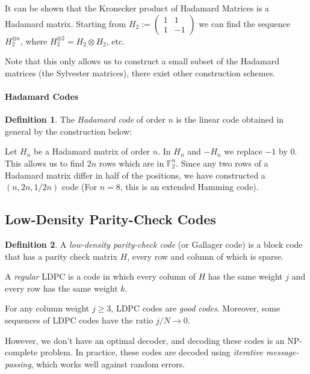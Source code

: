 \documentclass[11pt,a4paper]{article}
\theoremstyle{definition}
\newtheorem{definition}{Definition}[section]
\theoremstyle{plain}
\theoremstyle{remark}
\begin{document}
It can be shown that the Kronecker product of Hadamard Matrices is a Hadamard matrix. 
Starting from $H_2 := \begin{pmatrix}
    1 & 1 \\
    1 & -1 
\end{pmatrix}$ we can find the sequence $H_2^{\otimes n}$, where $H_2^{\otimes 2} = H_2 \otimes H_2$, etc. 

Note that this only allows us to construct a small subset of the Hadamard matrices (the Sylvester matrices), there exist other construction schemes.

\paragraph{Hadamard Codes} 
\begin{definition}
    The \emph{Hadamard code} of order $n$ is the linear code obtained in general by the construction below:
    
    Let $H_n$ be a Hadamard matrix of order $n$. In $H_n$ and $- H_n$ we replace $-1$ by $0$. 
    This allows us to find $2n$ rows which are in $\mathbb{F}_2^n$. Since any two rows of a Hadamard matrix differ in half of the positions, 
    we have constructed a $(n, 2n, 1/2 n)$ code (For $n = 8$, this is an extended Hamming code). 
\end{definition}

\subsection{Low-Density Parity-Check Codes} 
\begin{definition}
    A \emph{low-density parity-check code} (or Gallager code) is a block code that has a parity check matrix $H$, 
    every row and column of which is sparse. 

    A \emph{regular} LDPC is a code in which every column of $H$ has the same weight $j$ and every row has the same 
    weight $k$. 
\end{definition}

For any column weight $j \geq 3$, LDPC codes are \emph{good codes}. Moreover, some sequences of 
LDPC codes have the ratio $j / N \to 0$.  

However, we don't have an optimal decoder, and decoding these codes is an NP-complete problem. In practice,
these codes are decoded using \emph{iterative message-passing}, which works well against random errors. 
\end{document}
